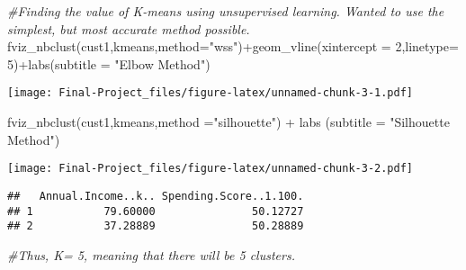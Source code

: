 \documentclass[
]{article}
\newenvironment{Shaded}{\begin{snugshade}}{\end{snugshade}}
\newcommand{\AttributeTok}[1]{\textcolor[rgb]{0.77,0.63,0.00}{#1}}
\newcommand{\CommentTok}[1]{\textcolor[rgb]{0.56,0.35,0.01}{\textit{#1}}}
\newcommand{\DecValTok}[1]{\textcolor[rgb]{0.00,0.00,0.81}{#1}}
\newcommand{\FunctionTok}[1]{\textcolor[rgb]{0.00,0.00,0.00}{#1}}
\newcommand{\NormalTok}[1]{#1}
\newcommand{\OtherTok}[1]{\textcolor[rgb]{0.56,0.35,0.01}{#1}}
\newcommand{\SpecialCharTok}[1]{\textcolor[rgb]{0.00,0.00,0.00}{#1}}
\newcommand{\StringTok}[1]{\textcolor[rgb]{0.31,0.60,0.02}{#1}}
\begin{document}
\begin{Shaded}
\begin{Highlighting}[]
\CommentTok{\#Finding the value of K{-}means using unsupervised learning. Wanted to use the simplest, but most accurate method possible. }
\FunctionTok{fviz\_nbclust}\NormalTok{(cust1,kmeans,}\AttributeTok{method=}\StringTok{"wss"}\NormalTok{)}\SpecialCharTok{+}\FunctionTok{geom\_vline}\NormalTok{(}\AttributeTok{xintercept =} \DecValTok{2}\NormalTok{,}\AttributeTok{linetype=} \DecValTok{5}\NormalTok{)}\SpecialCharTok{+}\FunctionTok{labs}\NormalTok{(}\AttributeTok{subtitle =} \StringTok{"Elbow Method"}\NormalTok{)}
\end{Highlighting}
\end{Shaded}

\texttt{[image: Final-Project\_files/figure-latex/unnamed-chunk-3-1.pdf]}

\begin{Shaded}
\begin{Highlighting}[]
\FunctionTok{fviz\_nbclust}\NormalTok{(cust1,kmeans,}\AttributeTok{method =}\StringTok{"silhouette"}\NormalTok{) }\SpecialCharTok{+} \FunctionTok{labs}\NormalTok{ (}\AttributeTok{subtitle =} \StringTok{"Silhouette Method"}\NormalTok{)}
\end{Highlighting}
\end{Shaded}

\texttt{[image: Final-Project\_files/figure-latex/unnamed-chunk-3-2.pdf]}

\begin{Shaded}
\end{Shaded}

\begin{verbatim}
##   Annual.Income..k.. Spending.Score..1.100.
## 1           79.60000               50.12727
## 2           37.28889               50.28889
\end{verbatim}

\begin{Shaded}
\begin{Highlighting}[]
\CommentTok{\#Thus, K= 5, meaning that there will be 5 clusters. }
\end{Highlighting}
\end{Shaded}
\end{document}
